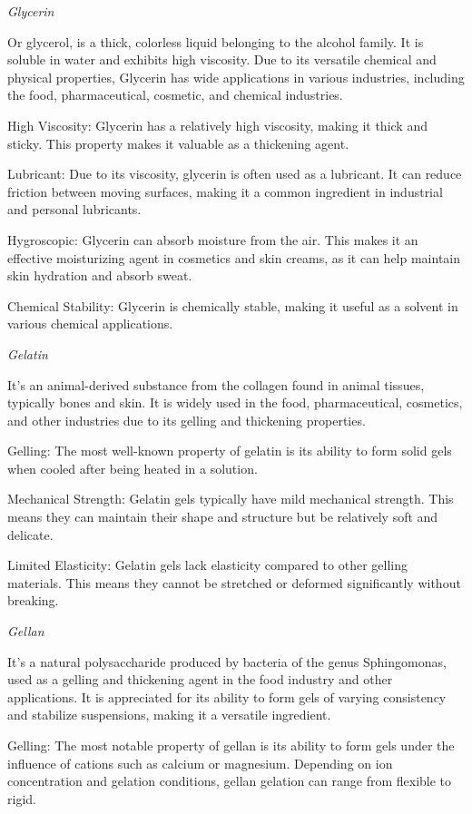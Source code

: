 \textit{Glycerin}

Or glycerol, is a thick, colorless liquid belonging to the alcohol family. It is soluble in water and exhibits high viscosity. Due to its versatile chemical and physical properties, Glycerin has wide applications in various industries, including the food, pharmaceutical, cosmetic, and chemical industries.
\item High Viscosity: Glycerin has a relatively high viscosity, making it thick and sticky. This property makes it valuable as a thickening agent.
\item Lubricant: Due to its viscosity, glycerin is often used as a lubricant. It can reduce friction between moving surfaces, making it a common ingredient in industrial and personal lubricants.
\item Hygroscopic: Glycerin can absorb moisture from the air. This makes it an effective moisturizing agent in cosmetics and skin creams, as it can help maintain skin hydration and absorb sweat.
\item Chemical Stability: Glycerin is chemically stable, making it useful as a solvent in various chemical applications.

\textit{Gelatin}

It's an animal-derived substance from the collagen found in animal tissues, typically bones and skin. It is widely used in the food, pharmaceutical, cosmetics, and other industries due to its gelling and thickening properties.
\item Gelling: The most well-known property of gelatin is its ability to form solid gels when cooled after being heated in a solution.
\item Mechanical Strength: Gelatin gels typically have mild mechanical strength. This means they can maintain their shape and structure but be relatively soft and delicate.
\item Limited Elasticity: Gelatin gels lack elasticity compared to other gelling materials. This means they cannot be stretched or deformed significantly without breaking.

\textit{Gellan}

It's a natural polysaccharide produced by bacteria of the genus Sphingomonas, used as a gelling and thickening agent in the food industry and other applications. It is appreciated for its ability to form gels of varying consistency and stabilize suspensions, making it a versatile ingredient.

\item Gelling: The most notable property of gellan is its ability to form gels under the influence of cations such as calcium or magnesium. Depending on ion concentration and gelation conditions, gellan gelation can range from flexible to rigid.

